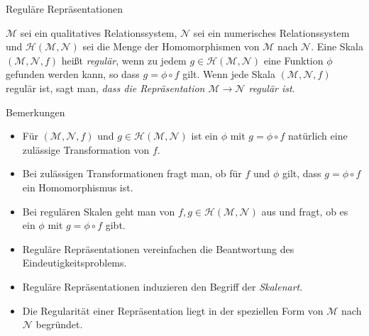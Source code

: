 \documentclass[
  8pt,
  ignorenonframetext,
]{beamer}
\providecommand{\tightlist}{%
  \setlength{\itemsep}{0pt}\setlength{\parskip}{0pt}}
\begin{document}
\begin{frame}{Reguläre Repräsentationen}
\protect\hypertarget{reguluxe4re-repruxe4sentationen-2}{}
\small
\begin{definition}
\justifying
$\mathcal{M}$ sei ein qualitatives Relationssystem, $\mathcal{N}$ sei ein numerisches
Relationssystem und $\mathcal{H}(\mathcal{M},\mathcal{N})$ sei die Menge der Homomorphismen
von $\mathcal{M}$ nach $\mathcal{N}$. Eine Skala $(\mathcal{M},\mathcal{N},f)$ heißt
\textit{regulär}, wenn zu jedem $g \in \mathcal{H}(\mathcal{M},\mathcal{N})$ eine
Funktion $\phi$ gefunden werden kann, so dass $g = \phi \circ f$ gilt. Wenn jede
Skala $(\mathcal{M},\mathcal{N}, f)$ regulär ist, sagt man, \textit{dass die Repräsentation 
$\mathcal{M}\to \mathcal{N}$ regulär ist}.
\end{definition}

\footnotesize

Bemerkungen \justifying

\begin{itemize}
\tightlist
\item
  Für \((\mathcal{M},\mathcal{N},f)\) und
  \(g \in \mathcal{H}(\mathcal{M},\mathcal{N})\) ist ein \(\phi\) mit
  \(g = \phi \circ f\) natürlich eine zulässige Transformation von
  \(f\).
\item
  Bei zulässigen Transformationen fragt man, ob für \(f\) und \(\phi\)
  gilt, dass \(g = \phi \circ f\) ein Homomorphismus ist.
\item
  Bei regulären Skalen geht man von
  \(f,g \in \mathcal{H}(\mathcal{M},\mathcal{N})\) aus und fragt, ob es
  ein \(\phi\) mit \(g = \phi \circ f\) gibt.
\item
  Reguläre Repräsentationen vereinfachen die Beantwortung des
  Eindeutigkeitsproblems.
\item
  Reguläre Repräsentationen induzieren den Begriff der \emph{Skalenart}.
\item
  Die Regularität einer Repräsentation liegt in der speziellen Form von
  \(\mathcal{M}\) nach \(\mathcal{N}\) begründet.
\end{itemize}
\end{frame}
\end{document}
